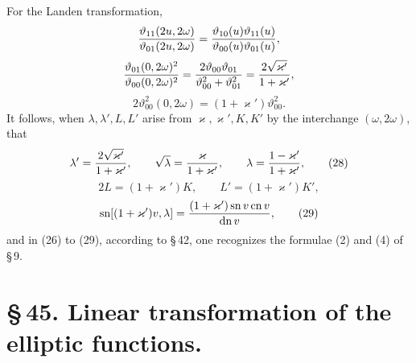 \documentclass[11pt]{article}
\providecommand{\tht}{\vartheta}
\providecommand{\sn}{\operatorname{sn}}
\providecommand{\cn}{\operatorname{cn}}
\providecommand{\dn}{\operatorname{dn}}
\begin{document}
For the Landen transformation,
\[
{\tht_{11}(2u,2\omega)\over\tht_{01}(2u,2\omega)}
={\tht_{10}(u)\tht_{11}(u)\over\tht_{00}(u)\tht_{01}(u)},
\]
\[
{\tht_{01}(0,2\omega)^2\over\tht_{00}(0,2\omega)^2}
={2\tht_{00}\tht_{01}\over\tht_{00}^{2}+\tht_{01}^{2}}
={2\sqrt{\varkappa'}\over1+\varkappa'},
\]
\[
2\tht_{00}^{2}(0,2\omega)=(1+\varkappa')\tht_{00}^{2}.
\]
It follows, when $\lambda,\lambda',L,L'$ arise from $\varkappa,\varkappa',K,K'$ by the interchange $(\omega,2\omega)$, that
\begin{equation}
\lambda'={2\sqrt{\varkappa'}\over1+\varkappa'},
\qquad
\sqrt\lambda={\varkappa\over1+\varkappa'},
\qquad
\lambda={1-\varkappa'\over1+\varkappa'},
\tag{28}
\end{equation}
\[
2L=(1+\varkappa')K,
\qquad
L'=(1+\varkappa')K',
\]
\begin{equation}
\sn[(1+\varkappa')v,\lambda]=
{(1+\varkappa')\sn v\cn v\over\dn v},
\tag{29}
\end{equation}
and in (26) to (29), according to \S\,42, one recognizes the formulae (2) and (4) of \S\,9.

\section*{\S\,45. Linear transformation of the elliptic functions.}
\end{document}
